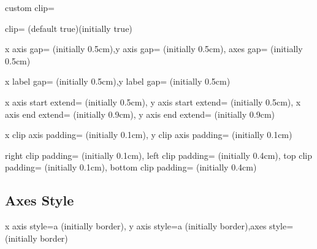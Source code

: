 \documentclass{ltxdoc}
\begin{document}
\begin{sseqdata}[name=ex1,degree={#1}{1-#1}]
\begin{key}{custom clip=}
\end{key}

\begin{key}{clip= (default true)(initially true)}

\end{key}

\begin{keylist}{x axis gap= (initially 0.5cm),y axis gap= (initially 0.5cm), axes gap= (initially 0.5cm)}

\end{keylist}


\begin{keylist}{x label gap= (initially 0.5cm),y label gap= (initially 0.5cm)}

\end{keylist}

\begin{keylist}{x axis start extend= (initially 0.5cm), y axis start extend= (initially 0.5cm),
                x axis end extend= (initially 0.9cm), y axis end extend= (initially 0.9cm)}

\end{keylist}

\begin{keylist}{x clip axis padding= (initially 0.1cm), y clip axis padding= (initially 0.1cm)}

\end{keylist}

\begin{keylist}{right clip padding= (initially 0.1cm), left clip padding= (initially 0.4cm),
                top clip padding= (initially 0.1cm), bottom clip padding= (initially 0.4cm)}

\end{keylist}


\subsection{Axes Style}

\begin{keylist}{x axis style=a (initially border), y axis style=a (initially border),axes style= (initially border)}

\end{keylist}


\end{sseqdata}
\end{document}
